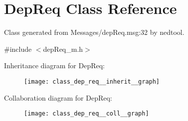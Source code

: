 \hypertarget{class_dep_req}{}\section{Dep\+Req Class Reference}
\label{class_dep_req}


Class generated from {\ttfamily Messages/dep\+Req.\+msg\+:32} by nedtool.  




{\ttfamily \#include $<$dep\+Req\+\_\+m.\+h$>$}



Inheritance diagram for Dep\+Req\+:
\nopagebreak
\begin{figure}[H]
\begin{center}
\leavevmode
\texttt{[image: class\_dep\_req\_\_inherit\_\_graph]}
\end{center}
\end{figure}


Collaboration diagram for Dep\+Req\+:
\nopagebreak
\begin{figure}[H]
\begin{center}
\leavevmode
\texttt{[image: class\_dep\_req\_\_coll\_\_graph]}
\end{center}
\end{figure}
